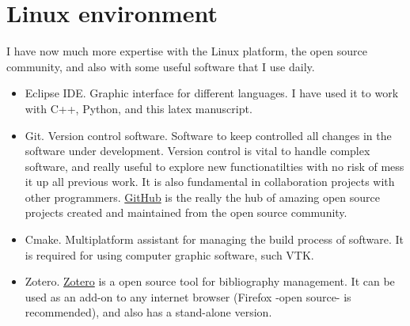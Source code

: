 \section{Linux environment}

I have now much more expertise with the Linux
platform, the open source community, and also with some useful software that I
use daily.
 
 \begin{itemize}
   \item Eclipse IDE. Graphic interface for different languages. I have used
   it to work with C++, Python, and this latex manuscript.
   \item Git. Version control software. Software to keep controlled all
   changes in the software under development. Version control is vital to handle
   complex software, and really useful to explore new functionatilties with no
   risk of mess it up all previous work. It is also fundamental in collaboration
   projects with other programmers. \href{https://github.com/}{GitHub} is the really the hub
   of amazing open source projects created and maintained from the open source community.
   \item Cmake. Multiplatform assistant for managing the build process of
   software. It is required for using computer graphic software, such VTK.
   \item Zotero. \href{http://www.zotero.org/}{Zotero} is a open
   source tool for bibliography management.  It can be used as an add-on to  any
   internet browser (Firefox -open source- is recommended), and also has a 
   stand-alone version.
 

 \end{itemize}
 





